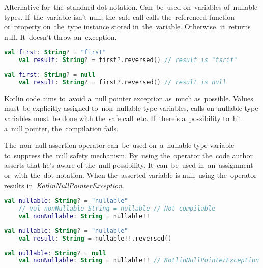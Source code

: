 \label{kotlinsafecall}
Alternative for~the~standard dot notation.
Can~be~used on~variables of~nullable types.
If~the~variable isn't null, the~safe call calls the~referenced function or~property on~the~type instance stored in~the~variable.
Otherwise, it~returns null.
It~doesn't throw an~exception.

\begin{lstlisting}[language=Kotlin]
    val first: String? = "first"
    val result: String? = first?.reversed() // result is "tsrif"
\end{lstlisting}

\begin{lstlisting}[language=Kotlin]
    val first: String? = null
    val result: String? = first?.reversed() // result is null
\end{lstlisting}

Kotlin code aims to~avoid a~null pointer exception as~much as~possible.
Values must~be explicitly assigned to~non--nullable type variables, calls on~nullable type variables must~be done with the~\hyperref[kotlinsafecall]{safe call}~etc.
If~there's a~possibility to~hit a~null pointer, the~compilation fails.

\mbox{The~non--null} assertion operator can~be~used on~a~nullable type variable to~suppress the~null safety mechanism.
By~using the~operator the~code author asserts that he's aware of the~null possibility.
It~can~be~used in~an~assignment or~with the~dot notation.
When the~asserted variable is null, using the~operator results \mbox{in \textit{KotlinNullPointerException}.}

\begin{lstlisting}[language=Kotlin]
    val nullable: String? = "nullable"
    // val nonNullable String = nullable // Not compilable
    val nonNullable: String = nullable!!
\end{lstlisting}

\begin{lstlisting}[language=Kotlin]
    val nullable: String? = "nullable"
    val result: String = nullable!!.reversed()
\end{lstlisting}

\begin{lstlisting}[language=Kotlin]
    val nullable: String? = null
    val nonNullable: String = nullable!! // KotlinNullPointerException
\end{lstlisting}

